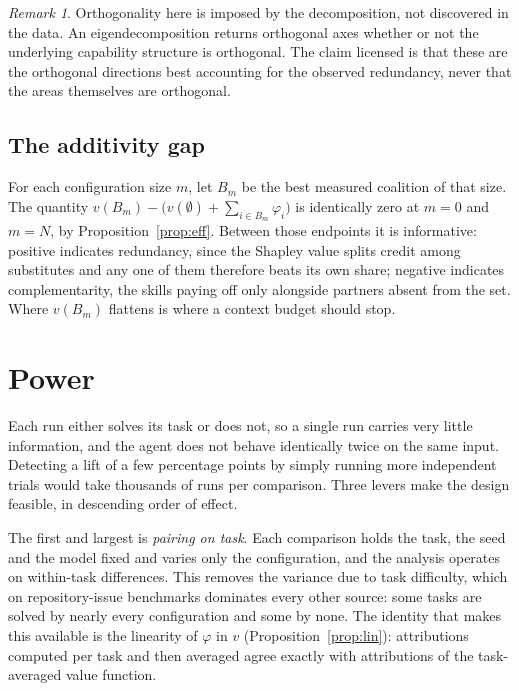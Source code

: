 \documentclass[11pt]{article}
\theoremstyle{plain}
\theoremstyle{definition}
\theoremstyle{remark}
\newtheorem{remark}[theorem]{Remark}
\begin{document}
\begin{remark}
Orthogonality here is imposed by the decomposition, not discovered in the data. An eigendecomposition returns orthogonal axes whether or not the underlying capability structure is orthogonal. The claim licensed is that these are the orthogonal directions best accounting for the observed redundancy, never that the areas themselves are orthogonal.
\end{remark}

\subsection{The additivity gap}

For each configuration size $m$, let $B_m$ be the best measured coalition of that size. The quantity $v(B_m) - \big(v(\emptyset) + \sum_{i \in B_m}\varphi_i\big)$ is identically zero at $m=0$ and $m=N$, by Proposition~\ref{prop:eff}. Between those endpoints it is informative: positive indicates redundancy, since the Shapley value splits credit among substitutes and any one of them therefore beats its own share; negative indicates complementarity, the skills paying off only alongside partners absent from the set. Where $v(B_m)$ flattens is where a context budget should stop.

\section{Power}
\label{sec:power}

Each run either solves its task or does not, so a single run carries very little information, and the agent does not behave identically twice on the same input. Detecting a lift of a few percentage points by simply running more independent trials would take thousands of runs per comparison. Three levers make the design feasible, in descending order of effect.

The first and largest is \emph{pairing on task}. Each comparison holds the task, the seed and the model fixed and varies only the configuration, and the analysis operates on within-task differences. This removes the variance due to task difficulty, which on repository-issue benchmarks dominates every other source: some tasks are solved by nearly every configuration and some by none. The identity that makes this available is the linearity of $\varphi$ in $v$ (Proposition~\ref{prop:lin}): attributions computed per task and then averaged agree exactly with attributions of the task-averaged value function.
\end{document}
